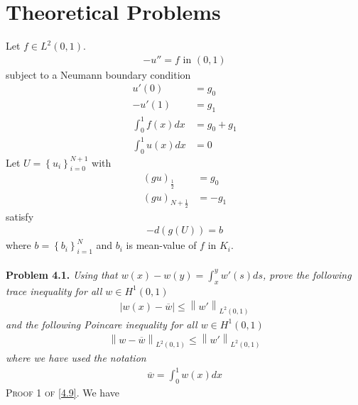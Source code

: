 \documentclass[a4paper]{article}
\numberwithin{equation}{section}
\begin{document}
\section{Theoretical Problems}
Let $f\in L^2\left(0,1\right)$.
\begin{align}
\label{4.1}
- {u''} = f\mbox{ in } \left( {0,1} \right)
\end{align}
subject to a Neumann boundary condition
\begin{align}
u'\left( 0 \right) &= {g_0}\\
 - u'\left( 1 \right) &= {g_1}\\
\int_0^1 {f\left( x \right)dx}  &= {g_0} + {g_1}\\
\int_0^1 {u\left( x \right)dx}  &= 0 \label{4.5}
\end{align}
Let $U=\left\{ {{u_i}} \right\}_{i = 0}^{N + 1}$ with 
\begin{align}
{\left( {gu} \right)_{\frac{1}{2}}} &= {g_0}\\
{\left( {gu} \right)_{N + \frac{1}{2}}} &=  - {g_1}
\end{align}
satisfy
\begin{align}
 - d\left( {g\left( U \right)} \right) = b
\end{align}
where $b = \left\{ {{b_i}} \right\}_{i = 1}^N$ and $b_i$ is mean-value of $f$ in $K_i$.\\
\\
\textbf{Problem 4.1.} \textit{Using that $w\left( x \right) - w\left( y \right) = \int_x^y {w'\left( s \right)ds} $, prove the following trace inequality for all $w\in H^1\left(0,1\right)$}
\begin{align}
\label{4.9}
\left| {w\left( x \right) - \overline w } \right| \le {\left\| {w'} \right\|_{{L^2}\left( {0,1} \right)}}
\end{align}
\textit{and the following Poincare inequality for all $w\in H^1\left(0,1\right)$}
\begin{align}
\label{4.10}
{\left\| {w - \overline w } \right\|_{{L^2}\left( {0,1} \right)}} \le {\left\| {w'} \right\|_{{L^2}\left( {0,1} \right)}}
\end{align}
\textit{where we have used the notation}
\begin{align}
\overline w  = \int_0^1 {w\left( x \right)dx} 
\end{align}
\textsc{Proof 1 of \eqref{4.9}.} We have
\end{document}
